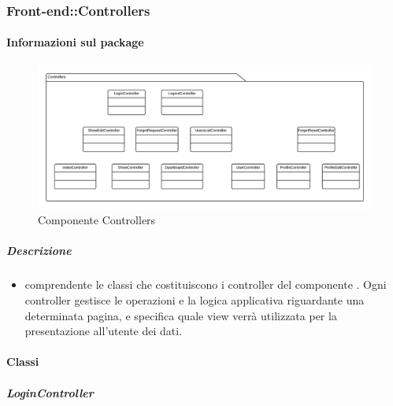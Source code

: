 	\subsubsection{Front-end::Controllers}
	\paragraph{Informazioni sul package} 
		\begin{figure}[H] 
			\begin{center} 
				\includegraphics[width=\textwidth]{uml/package/Front-end::Controllers.png}  
				\caption{Componente Controllers}
			\end{center}  
		\end{figure} 
	\subparagraph{Descrizione} 
		\begin{itemize}
		\item[]  comprendente le classi che costituiscono i controller del componente . Ogni controller gestisce le operazioni e la logica applicativa riguardante una determinata pagina, e specifica quale view verrà utilizzata per la presentazione all'utente dei dati.
		\end{itemize} 
		\paragraph{Classi}
			\subparagraph{LoginController}
				
